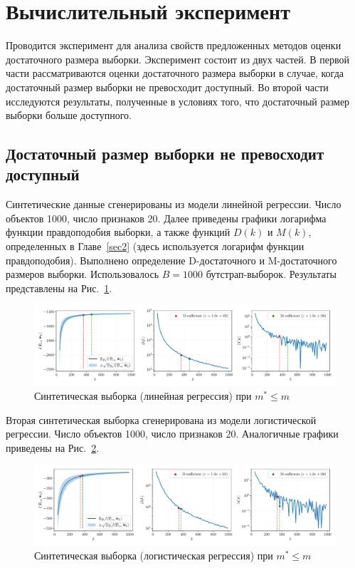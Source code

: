 \section{Вычислительный эксперимент}\label{sec4}

Проводится эксперимент для анализа свойств предложенных методов оценки достаточного размера выборки. Эксперимент состоит из двух частей. В первой части рассматриваются оценки достаточного размера выборки в случае, когда достаточный размер выборки не превосходит доступный. Во второй части исследуются результаты, полученные в условиях того, что достаточный размер выборки больше доступного.

\subsection{Достаточный размер выборки не превосходит доступный}

Синтетические данные сгенерированы из модели линейной регрессии. Число объектов 1000, число признаков 20. Далее приведены графики логарифма функции правдоподобия выборки, а также функций $D(k)$ и $M(k)$, определенных в Главе~\ref{sec2} (здесь используется логарифм функции правдоподобия). Выполнено определение D-достаточного и M-достаточного размеров выборки. Использовалось $B=1000$ бутстрап-выборок. Результаты представлены на Рис.~\ref{synthetic-regression-sufficient}.

\begin{figure}[h!]
    \centering
    \includegraphics[width=\textwidth]{figures/synthetic-regression-sufficient.pdf}
    \caption{Синтетическая выборка (линейная регрессия) при $m^* \leqslant m$}
    \label{synthetic-regression-sufficient}
\end{figure}

Вторая синтетическая выборка сгенерирована из модели логистической регрессии. Число объектов 1000, число признаков 20. Аналогичные графики приведены на Рис.~\ref{synthetic-classification-sufficient}.

\begin{figure}[h!]
    \centering
    \includegraphics[width=\textwidth]{figures/synthetic-classification-sufficient.pdf}
    \caption{Синтетическая выборка (логистическая регрессия) при $m^* \leqslant m$}
    \label{synthetic-classification-sufficient}
\end{figure}

